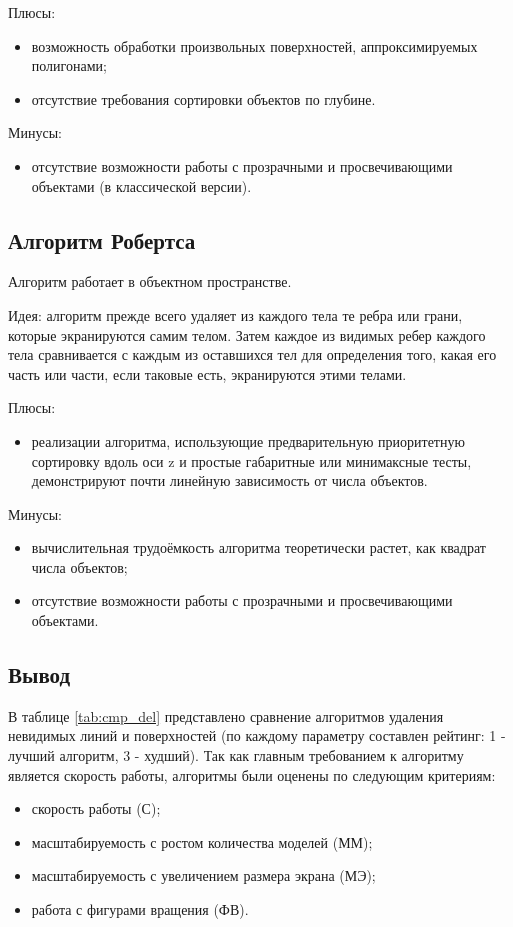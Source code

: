 Плюсы:
\begin{itemize}
    \item возможность обработки произвольных поверхностей, аппроксимируемых полигонами;
    \item отсутствие требования сортировки объектов по глубине.
\end{itemize}

Минусы:
\begin{itemize}
    \item отсутствие возможности работы с прозрачными и просвечивающими объектами (в классической версии).
\end{itemize}

\subsection{Алгоритм Робертса}
Алгоритм работает в объектном пространстве\cite{robert}.

Идея: алгоритм прежде всего удаляет из каждого тела те ребра или грани, которые экранируются самим телом. Затем каждое из видимых ребер каждого тела сравнивается с каждым из оставшихся тел для определения того, какая его часть или части, если таковые есть, экранируются этими телами.

Плюсы:
\begin{itemize}
    \item реализации алгоритма, использующие предварительную приоритетную сортировку вдоль оси z и простые габаритные или минимаксные тесты, демонстрируют почти линейную зависимость от числа объектов\cite{robert}.
\end{itemize}

Минусы:
\begin{itemize}
    \item вычислительная трудоёмкость алгоритма теоретически растет, как квадрат числа объектов\cite{robert};
    \item отсутствие возможности работы с прозрачными и просвечивающими объектами.
\end{itemize}

\subsection*{Вывод}

В таблице \ref{tab:cmp_del} представлено сравнение алгоритмов\cite{rogers} удаления невидимых линий и поверхностей (по каждому параметру составлен рейтинг: 1 - лучший алгоритм, 3 - худший). Так как главным требованием к алгоритму является скорость работы, алгоритмы были оценены по следующим критериям:
\begin{itemize}
    \item скорость работы (С);
    \item масштабируемость с ростом количества моделей (ММ);
    \item масштабируемость с увеличением размера экрана (МЭ);
    \item работа с фигурами вращения (ФВ).
\end{itemize}

